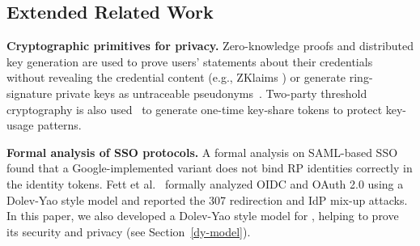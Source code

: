\subsection{Extended Related Work}
\noindent\textbf{Cryptographic primitives for privacy.}
Zero-knowledge proofs and distributed key generation are used to prove users' statements about their credentials without revealing the credential content (e.g., ZKlaims \cite{zklaim}) or generate ring-signature private keys as untraceable pseudonyms~\cite{crypto-book}. Two-party threshold cryptography is also used~\cite{tandem} to generate one-time key-share tokens to protect key-usage patterns.



\noindent\textbf{Formal analysis of SSO protocols.}
A formal analysis on SAML-based SSO \cite{ArmandoCCCT08} found that a Google-implemented variant does not bind RP identities correctly in the identity tokens.
Fett et al.~\cite{FettKS16, FettKS17} formally analyzed OIDC and OAuth 2.0 using a Dolev-Yao style model \cite{FettKS14} and reported the 307 redirection and IdP mix-up attacks.
In this paper, we also developed a Dolev-Yao style model for \usso, helping to prove its security and privacy (see Section~\ref{dy-model}).


